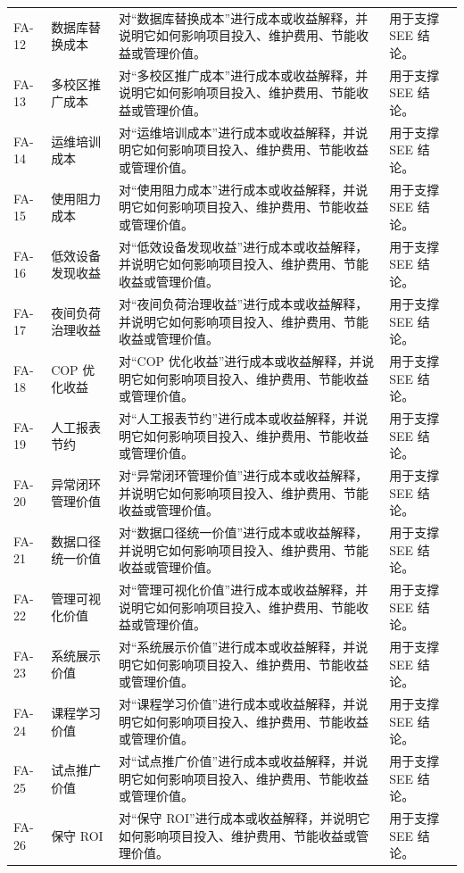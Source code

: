 \documentclass[12pt,a4paper]{ctexart}
\begin{document}
\begin{longtable}{L{1.7cm}L{4.0cm}L{6.4cm}L{3.4cm}}
FA-12 & 数据库替换成本 & 对“数据库替换成本”进行成本或收益解释，并说明它如何影响项目投入、维护费用、节能收益或管理价值。 & 用于支撑 SEE 结论。 \\
FA-13 & 多校区推广成本 & 对“多校区推广成本”进行成本或收益解释，并说明它如何影响项目投入、维护费用、节能收益或管理价值。 & 用于支撑 SEE 结论。 \\
FA-14 & 运维培训成本 & 对“运维培训成本”进行成本或收益解释，并说明它如何影响项目投入、维护费用、节能收益或管理价值。 & 用于支撑 SEE 结论。 \\
FA-15 & 使用阻力成本 & 对“使用阻力成本”进行成本或收益解释，并说明它如何影响项目投入、维护费用、节能收益或管理价值。 & 用于支撑 SEE 结论。 \\
FA-16 & 低效设备发现收益 & 对“低效设备发现收益”进行成本或收益解释，并说明它如何影响项目投入、维护费用、节能收益或管理价值。 & 用于支撑 SEE 结论。 \\
FA-17 & 夜间负荷治理收益 & 对“夜间负荷治理收益”进行成本或收益解释，并说明它如何影响项目投入、维护费用、节能收益或管理价值。 & 用于支撑 SEE 结论。 \\
FA-18 & COP 优化收益 & 对“COP 优化收益”进行成本或收益解释，并说明它如何影响项目投入、维护费用、节能收益或管理价值。 & 用于支撑 SEE 结论。 \\
FA-19 & 人工报表节约 & 对“人工报表节约”进行成本或收益解释，并说明它如何影响项目投入、维护费用、节能收益或管理价值。 & 用于支撑 SEE 结论。 \\
FA-20 & 异常闭环管理价值 & 对“异常闭环管理价值”进行成本或收益解释，并说明它如何影响项目投入、维护费用、节能收益或管理价值。 & 用于支撑 SEE 结论。 \\
FA-21 & 数据口径统一价值 & 对“数据口径统一价值”进行成本或收益解释，并说明它如何影响项目投入、维护费用、节能收益或管理价值。 & 用于支撑 SEE 结论。 \\
FA-22 & 管理可视化价值 & 对“管理可视化价值”进行成本或收益解释，并说明它如何影响项目投入、维护费用、节能收益或管理价值。 & 用于支撑 SEE 结论。 \\
FA-23 & 系统展示价值 & 对“系统展示价值”进行成本或收益解释，并说明它如何影响项目投入、维护费用、节能收益或管理价值。 & 用于支撑 SEE 结论。 \\
FA-24 & 课程学习价值 & 对“课程学习价值”进行成本或收益解释，并说明它如何影响项目投入、维护费用、节能收益或管理价值。 & 用于支撑 SEE 结论。 \\
FA-25 & 试点推广价值 & 对“试点推广价值”进行成本或收益解释，并说明它如何影响项目投入、维护费用、节能收益或管理价值。 & 用于支撑 SEE 结论。 \\
FA-26 & 保守 ROI & 对“保守 ROI”进行成本或收益解释，并说明它如何影响项目投入、维护费用、节能收益或管理价值。 & 用于支撑 SEE 结论。 \\

\end{longtable}
\end{document}
